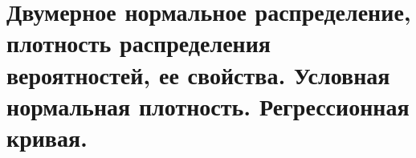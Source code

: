 \documentclass[polytech/stats/exam-2023/stats-exam-2023.tex]{subfiles}
\begin{document}
\section{Двумерное нормальное распределение, плотность распределения вероятностей, ее свойства. Условная нормальная плотность. Регрессионная кривая.}
\end{document}
